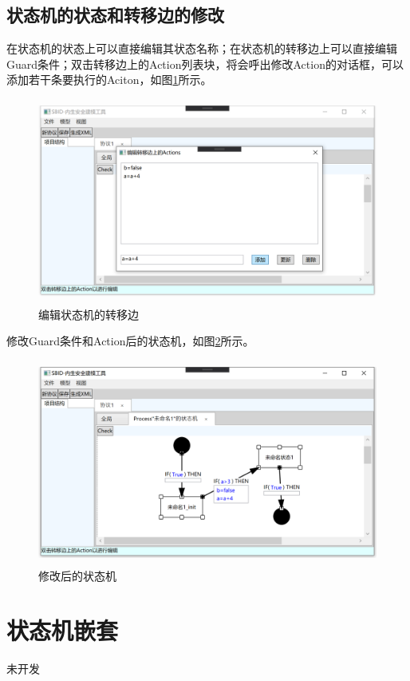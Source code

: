 \subsection{状态机的状态和转移边的修改}
在状态机的状态上可以直接编辑其状态名称；在状态机的转移边上可以直接编辑Guard条件；双击转移边上的Action列表块，将会呼出修改Action的对话框，可以添加若干条要执行的Aciton，如图\ref{statemachine_edit_action}所示。
\begin{figure}[h]
	\centering
	\includegraphics[width=12cm,height=6.75cm]{imgs/statemachine_edit_action.png}
	\caption{编辑状态机的转移边}
	\label{statemachine_edit_action}
\end{figure}
\par
修改Guard条件和Action后的状态机，如图\ref{statemachine_edited_action}所示。
\begin{figure}[h]
	\centering
	\includegraphics[width=12cm,height=6.75cm]{imgs/statemachine_edited_action.png}
	\caption{修改后的状态机}
	\label{statemachine_edited_action}
\end{figure}

\section{状态机嵌套}
未开发
